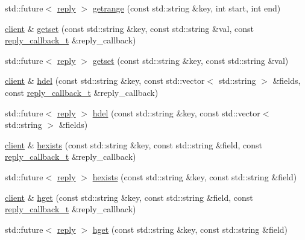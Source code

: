 \begin{DoxyCompactItemize}
\item 
std\+::future$<$ \hyperlink{classcpp__redis_1_1reply}{reply} $>$ \hyperlink{classcpp__redis_1_1client_a3a0ed59f7fc32ba22c1a9be3c02e5468}{getrange} (const std\+::string \&key, int start, int end)
\item 
\hyperlink{classcpp__redis_1_1client}{client} \& \hyperlink{classcpp__redis_1_1client_a124dca021c3aedd3f8cbb52263e7fec8}{getset} (const std\+::string \&key, const std\+::string \&val, const \hyperlink{classcpp__redis_1_1client_a061a1140d36d2eaeda82b09a0bb3f9f2}{reply\+\_\+callback\+\_\+t} \&reply\+\_\+callback)
\item 
std\+::future$<$ \hyperlink{classcpp__redis_1_1reply}{reply} $>$ \hyperlink{classcpp__redis_1_1client_abcbf060105acb8b1d7b14a5102be19a0}{getset} (const std\+::string \&key, const std\+::string \&val)
\item 
\hyperlink{classcpp__redis_1_1client}{client} \& \hyperlink{classcpp__redis_1_1client_adc62af1a2d07d04fbf274f98f374ab47}{hdel} (const std\+::string \&key, const std\+::vector$<$ std\+::string $>$ \&fields, const \hyperlink{classcpp__redis_1_1client_a061a1140d36d2eaeda82b09a0bb3f9f2}{reply\+\_\+callback\+\_\+t} \&reply\+\_\+callback)
\item 
std\+::future$<$ \hyperlink{classcpp__redis_1_1reply}{reply} $>$ \hyperlink{classcpp__redis_1_1client_a56d4df4d31ffc56e097a8a78cb85d861}{hdel} (const std\+::string \&key, const std\+::vector$<$ std\+::string $>$ \&fields)
\item 
\hyperlink{classcpp__redis_1_1client}{client} \& \hyperlink{classcpp__redis_1_1client_a36aa37c50e8b5e44e17c4f1f0d2c656e}{hexists} (const std\+::string \&key, const std\+::string \&field, const \hyperlink{classcpp__redis_1_1client_a061a1140d36d2eaeda82b09a0bb3f9f2}{reply\+\_\+callback\+\_\+t} \&reply\+\_\+callback)
\item 
std\+::future$<$ \hyperlink{classcpp__redis_1_1reply}{reply} $>$ \hyperlink{classcpp__redis_1_1client_a1fede52ba18414d75f37e776cc62b7f8}{hexists} (const std\+::string \&key, const std\+::string \&field)
\item 
\hyperlink{classcpp__redis_1_1client}{client} \& \hyperlink{classcpp__redis_1_1client_ac1db14da1ab3d1353ce35a1c923979e3}{hget} (const std\+::string \&key, const std\+::string \&field, const \hyperlink{classcpp__redis_1_1client_a061a1140d36d2eaeda82b09a0bb3f9f2}{reply\+\_\+callback\+\_\+t} \&reply\+\_\+callback)
\item 
std\+::future$<$ \hyperlink{classcpp__redis_1_1reply}{reply} $>$ \hyperlink{classcpp__redis_1_1client_aa84b4c8e9391f5ed37d4c9ef977e2c85}{hget} (const std\+::string \&key, const std\+::string \&field)

\end{DoxyCompactItemize}
